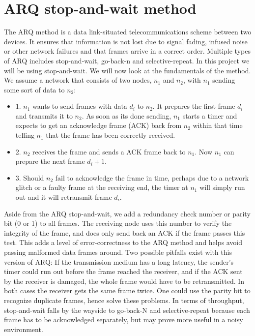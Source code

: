 \section{ARQ stop-and-wait method}\label{th:arq}

The ARQ method is a data link-situated telecommunications scheme between two devices. It ensures that information is not lost due to signal fading, infused noise or other network failures and that frames arrive in a correct order. Multiple types of ARQ includes stop-and-wait, go-back-n and selective-repeat. In this project we will be using stop-and-wait. We will now look at the fundamentals of the method. We assume a network that consists of two nodes, $n_1$ and $n_2$, with $n_1$ sending some sort of data to $n_2$:

\begin{itemize}
	\item 1. $n_1$ wants to send frames with data $d_i$ to $n_2$. It prepares the first frame $d_i$ and transmits it to $n_2$. As soon as its done sending, $n_1$ starts a timer and expects to get an acknowledge frame (ACK) back from $n_2$ within that time telling $n_1$ that the frame has been correctly received.
	\item 2. $n_2$ receives the frame and sends a ACK frame back to $n_1$. Now $n_1$ can prepare the next frame $d_i+1$.
	\item 3. Should $n_2$ fail to acknowledge the frame in time, perhaps due to a network glitch or a faulty frame at the receiving end, the timer at $n_1$ will simply run out and it will retransmit frame $d_i$.
\end{itemize}

\noindent Aside from the ARQ stop-and-wait, we add a redundancy check number or parity bit (0 or 1) to all frames. The receiving node uses this number to verify the integrity of the frame, and does only send back an ACK if the frame passes this test. This adds a level of error-correctness to the ARQ method and helps avoid passing malformed data frames around. Two possible pitfalls exist with this version of ARQ: If the transmission medium has a long latency, the sender's timer could run out before the frame reached the receiver, and if the ACK sent by the receiver is damaged, the whole frame would have to be retransmitted. In both cases the receiver gets the same frame twice. One could use the parity bit to recognize duplicate frames, hence solve these problems. In terms of throughput, stop-and-wait falls by the wayside to go-back-N and selective-repeat because each frame has to be acknowledged separately, but may prove more useful in a noisy environment.
